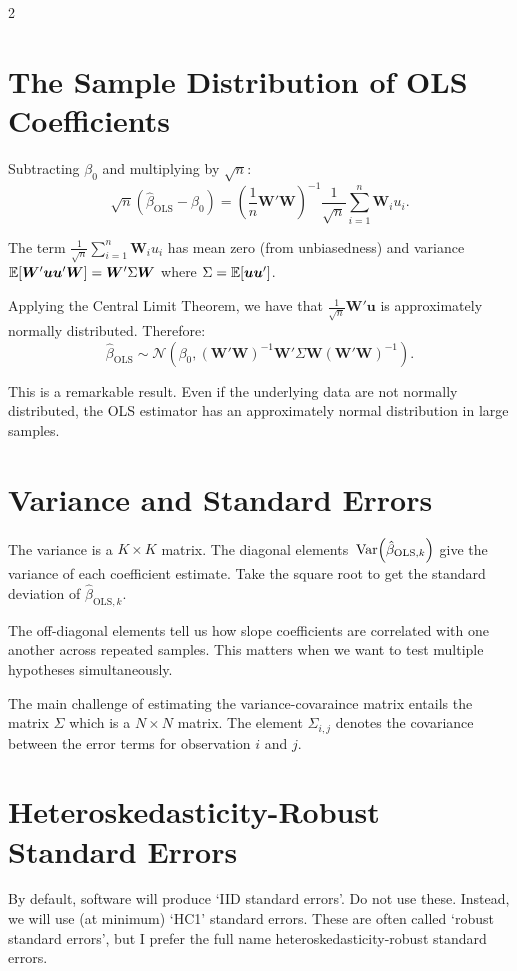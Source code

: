 \documentclass[12pt]{article}
\begin{document}
\begin{multicols}{2}
  \section*{The Sample Distribution of OLS Coefficients}

  Subtracting $\beta_0$ and multiplying by $\sqrt{n}$:
  $$
  \sqrt{n} \left( \hat{\beta}_{\text{OLS}} - \beta_0 \right) =
  \left( \frac{1}{n} \bm{W}' \bm{W} \right)^{-1} \frac{1}{\sqrt{n}} \sum_{i=1}^n \bm{W}_i u_i.
  $$

  The term $\frac{1}{\sqrt{n}} \sum_{i=1}^n \bm{W}_i u_i$ has mean zero (from unbiasedness) and variance $\expec{\bm{W}' \bm{u} \bm{u}' \bm{W}} = \bm{W}' \Sigma \bm{W}$ where $\Sigma = \expec{\bm{u} \bm{u}'}$.

  Applying the Central Limit Theorem, we have that $\frac{1}{\sqrt{n}} \bm{W}' \bm{u}$ is approximately normally distributed. Therefore:
  $$
  \hat{\beta}_{\text{OLS}} \sim
  \mathcal{N}\left( \beta_0, \left(\bm{W}' \bm{W} \right)^{-1} \bm{W}' \Sigma \bm{W} \left(\bm{W}' \bm{W} \right)^{-1} \right).
  $$

  This is a remarkable result. Even if the underlying data are not normally distributed, the OLS estimator has an approximately normal distribution in large samples.

  \section*{Variance and Standard Errors}

  The variance is a $K \times K$ matrix. The diagonal elements $\var{\hat{\beta}_{\text{OLS}, k}}$ give the variance of each coefficient estimate. Take the square root to get the standard deviation of $\hat{\beta}_{\text{OLS}, k}$.

  The off-diagonal elements tell us how slope coefficients are correlated with one another across repeated samples. This matters when we want to test multiple hypotheses simultaneously.

  \bigskip
  The main challenge of estimating the variance-covaraince matrix entails the matrix $\Sigma$ which is a $N \times N$ matrix.
  The element $\Sigma_{i,j}$ denotes the covariance between the error terms for observation $i$ and $j$.

  \section*{Heteroskedasticity-Robust Standard Errors}
  By default, software will produce `IID standard errors'.
  Do not use these. Instead, we will use (at minimum) `HC1' standard errors.
  These are often called `robust standard errors', but I prefer the full name heteroskedasticity-robust standard errors.


\end{multicols}
\end{document}
